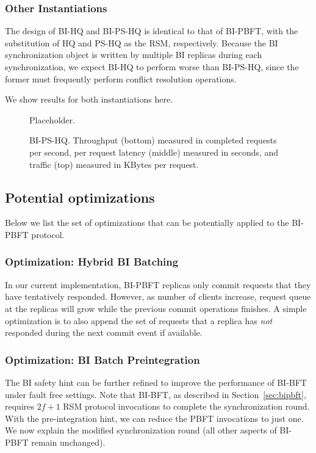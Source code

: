 \documentclass[twocolumn,10pt]{article}
\begin{document}
\subsubsection{Other Instantiations}

The design of BI-HQ and BI-PS-HQ is identical to that of BI-PBFT, with
the substitution of HQ and PS-HQ as the RSM, respectively.  Because the
BI synchronization object is written by multiple BI replicas during each
synchronization, we expect BI-HQ to perform worse than BI-PS-HQ, since
the former must frequently perform conflict resolution operations.

We show results for both instantiations here.


\begin{figure}
\centering
Placeholder.
\caption{BI-PS-HQ. Throughput (bottom) measured in completed requests per second,
  per request latency (middle) measured in seconds, and traffic
  (top) measured in KBytes per request.}
\label{fig:bi-hq}
\end{figure}

\fi

\subsection{Potential optimizations}

Below we list the set of optimizations that can be potentially applied to the BI-PBFT protocol.


\subsubsection{Optimization: Hybrid BI Batching}

In our current implementation, BI-PBFT replicas only commit requests that they
have tentatively responded. However, as number of clients increase, request queue
at the replicas will grow while the previous commit operations finishes. A simple
optimization is to also append the set of requests that a replica has \emph{not}
responded during the next commit event if available. 


\subsubsection{Optimization: BI Batch Preintegration}

The BI safety hint can be further refined to improve the performance of
BI-BFT under fault free settings. Note that BI-BFT, as described in 
Section~\ref{sec:bipbft}, requires $2f+1$ RSM protocol invocations to 
complete the synchronization round. With the pre-integration hint, we can reduce
the PBFT invocations to just one. We now explain the modified synchronization round 
(all other aspects of BI-PBFT remain unchanged).
\end{document}
